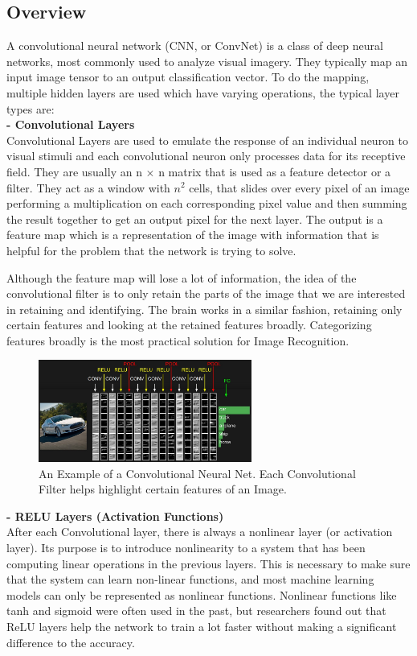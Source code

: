 \documentclass{ieee}
\begin{document}
\subsection{Overview}
A convolutional neural network (CNN, or ConvNet) is a class of deep neural networks, most commonly used to analyze visual imagery. They typically map an input image tensor to an output classification vector. To do the mapping, multiple hidden layers are used which have varying operations, the typical layer types are:\\
\textbf{- Convolutional Layers} \\
Convolutional Layers are used to emulate the response of an individual neuron to visual stimuli and each convolutional neuron only processes data for its receptive field. They are usually an n $\times$ n matrix that is used as a feature detector or a filter. They act as a window with $n^2$ cells, that slides over every pixel of an image performing a multiplication on each corresponding pixel value and then summing the result together to get an output pixel for the next layer. The output is a feature map which is a representation of the image with information that is helpful for the problem that the network is trying to solve.

Although the feature map will lose a lot of information, the idea of the convolutional filter is to only retain the parts of the image that we are interested in retaining and identifying.
 The brain works in a similar fashion, retaining only certain features and looking at the retained features broadly. Categorizing features broadly is the most practical solution for Image Recognition.
 \begin{figure}[h]
    \begin{center}
    \includegraphics[width=7cm]{images/convnet.jpeg}
    \end{center}
    \label{mbconv_fig}
    \caption{An Example of a Convolutional Neural Net. Each Convolutional Filter helps highlight certain features of an Image. \cite{CONVNETIMAGE}}
\end{figure}

\textbf{- RELU Layers (Activation Functions) }\\
 After each Convolutional layer, there is always a nonlinear layer (or activation layer). Its purpose is to introduce nonlinearity to a system that has been computing linear operations in the previous layers. This is necessary to make sure that the system can learn non-linear functions, and most machine learning models can only be represented as nonlinear functions. Nonlinear functions like tanh and sigmoid were often used in the past, but researchers found out that ReLU layers help the network to train a lot faster without making a significant difference to the accuracy.
 
\end{document}
